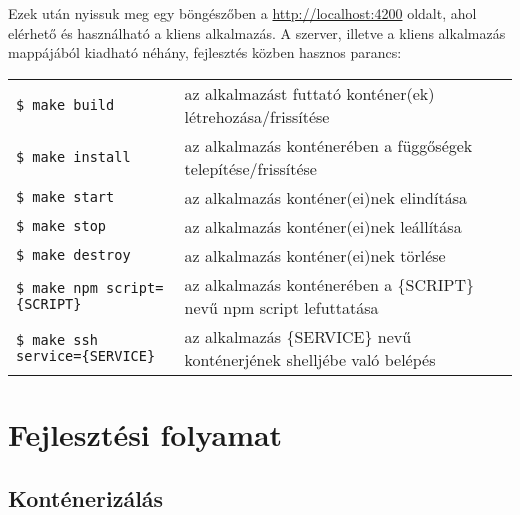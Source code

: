 \documentclass{elteikthesis}
\begin{document}
				Ezek után nyissuk meg egy böngészőben a \url{http://localhost:4200} oldalt, ahol elérhető és használható a kliens alkalmazás. A szerver, illetve a kliens alkalmazás mappájából kiadható néhány, fejlesztés közben hasznos parancs:
				\begin{center}
					\begin{tabularx}{\textwidth}{l>{\RaggedRight}X}
						\texttt{\$ make build} & az alkalmazást futtató konténer(ek) létrehozása/frissítése \\
						\texttt{\$ make install} & az alkalmazás konténerében a függőségek telepítése/frissítése \\
						\texttt{\$ make start} & az alkalmazás konténer(ei)nek elindítása \\
						\texttt{\$ make stop} & az alkalmazás konténer(ei)nek leállítása \\
						\texttt{\$ make destroy} & az alkalmazás konténer(ei)nek törlése \\
						\texttt{\$ make npm script=\{SCRIPT\}} & az alkalmazás konténerében a \{SCRIPT\} nevű npm script lefuttatása \\
						\texttt{\$ make ssh service=\{SERVICE\}} & az alkalmazás \{SERVICE\} nevű konténerjének shelljébe való belépés
					\end{tabularx}	
				\end{center}
				
		\section{Fejlesztési folyamat}

			\subsection{Konténerizálás}
\end{document}
